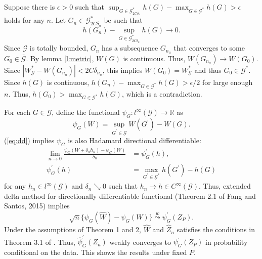 \documentclass[12pt,oneside,reqno,english]{amsart}
\theoremstyle{definition}
\begin{document}
Suppose there is $\epsilon>0$ such that 
$\sup_{G\in \mathcal{G}^{*}_{2C\delta_{n}}}h(G)-\max_{G\in \mathcal{G}^{*}}h(G)>\epsilon$ holds for any $n$. 
Let $G_{n}\in \mathcal{G}^{*}_{2C\delta_{n}}$ be such that 
\[h(G_{n})-\sup_{G\in \mathcal{G}^{*}_{2C\delta_{n}}}h(G)\rightarrow 0.\]
Since $\mathcal{G}$ is totally bounded, $G_{n}$ has a subsequence $G_{n_{a}}$ that converges to some $G_{0}\in \bar{\mathcal{G}}$. 
By lemma \ref{l:metric}, $W(G)$ is continuous. Thus, $W(G_{n_{a}}) \rightarrow W(G_{0})$. Since $|W^{*}_{\mathcal{G}}-W(G_{n_{a}})|< 2C\delta_{n_{a}}$,
this implies $W(G_{0})=W^{*}_{\mathcal{G}}$ and thus
 $G_{0}\in \mathcal{G}^{*}$.   
Since $h(G)$ is continuous, $h(G_{n})-\max_{G\in \mathcal{G}^{*}}h(G)>\epsilon/2$ for large enough $n$. 
Thus, $h(G_{0})> \max_{G\in \mathcal{G}^{*}}h(G)$, which is a contradiction. 

For each $G\in \mathcal{G}$, define the functional $\psi_{G}:l^{\infty}(\mathcal{G})\rightarrow \mathbb{R}$ as 
\[\psi_{G}(W)=\sup_{G^{\prime}\in \mathcal{G}}W(G^{\prime})-W(G).\]
(\ref{eq:dd}) implies $\psi_{G}$ is also Hadamard directional differentiable:
\begin{align*}
\lim_{n\rightarrow 0}\frac{\psi_{G}(W+\delta_{n}h_{n})-\psi_{G}(W)}{\delta_{n}}&=\psi_{G}^{\prime}(h),\\
\psi_{G}^{\prime}(h)&=\max_{G^{\prime}\in \mathcal{G}^{*}}h(G^{\prime})-h(G)
\end{align*}
for any $h_{n}\in l^{\infty}(\mathcal{G})$ and $\delta_{n}\searrow 0$ such that $h_{n}\rightarrow h\in C^{\infty}(\mathcal{G})$. 
Thus, extended delta method for directionally differentiable functional (Theorem 2.1 of Fang and Santos, 2015) implies 
\[\sqrt{n}\{\psi_{G}(\hat{W})-\psi_{G}(W)\}\overset{w}{\underset{}{\leadsto}}\psi^{\prime}_{G}(Z_{P}).\]
Under the assumptions of Theorem 1 and 2, $\hat{W}$ and $\hat{Z}_{n}$ satisfies the conditions in Theorem 3.1 of \cite{HL:18}. Thus, 
$\hat{\psi}^{\prime}_{G}(Z_{n})$ weakly converges to $\psi^{\prime}_{G}(Z_{P})$ in probability conditional on the data. This shows the results under 
fixed $P$. 
\end{document}

